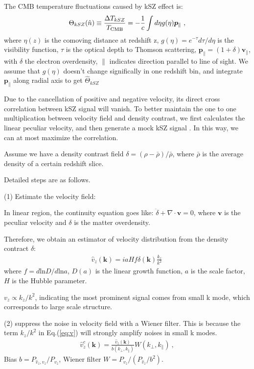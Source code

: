 \label{sec:kszRecon}
The CMB temperature fluctuations caused by kSZ effect is:
\begin{eqnarray}
\label{eq:ksz}
\Theta_{kSZ}(\hat n)\equiv\frac{\Delta T_{kSZ}}{T_{\mathrm{CMB}}}
=-\frac{1}{c}\int d\eta  g(\eta)  \bm{p}_\parallel\ ,
\end{eqnarray}
where $\eta(z)$ is the comoving distance at redshift z, $g(\eta)=e^{-\tau} d\tau/d\eta$ is the visibility function, $\tau$ is the optical depth to Thomson scattering, $\bm{p}_\parallel=(1+\delta)\bm{v}_\parallel$, with $\delta$ the electron overdensity, $\parallel$ indicates direction parallel to line of sight. 
We assume that $g(\eta)$ doesn't change significally in one redshift bin, 
and integrate $\bm{p}_\parallel$ along radial axis to get $\hat \Theta_{kSZ}$

Due to the cancellation of positive and negative velocity, its direct cross correlation between kSZ signal will vanish.
To better maintain the one to one multiplication between velocity field and density contrast, 
we first calculates the linear peculiar velocity, and then generate a mock kSZ signal 
\cite{Shao11}.
In this way, we can at most maximize the correlation.

Assume we have a density contrast field $\delta=(\rho-\bar{\rho})/\bar{\rho}$, where $\bar\rho$ is the average density of a certain redshift slice. 

Detailed steps are as follows.

(1) Estimate the velocity field:

In linear region, the continuity equation goes like:
$\dot \delta+\nabla \cdot \bm{v}=0$, 
where $\bm{v}$ is the peculiar velocity and $\delta$ is the matter overdensity. 

Therefore, we obtain an estimator of velocity distribution from the density contract $\delta$:
\begin{eqnarray}
	\label{eq:v}
\hat v_z(\bm{k})=i a H f\delta(\bm{k})\frac{k_z}{k^2}\,
\end{eqnarray}
where $f=d\mathrm{ln}D/d\mathrm{ln}a$, $D(a)$ is the linear growth function, 
$a$ is the scale factor, $H$ is the Hubble parameter.

$v_z \propto k_z/k^2$, indicating the most prominent signal comes from small k mode, which corresponds to large scale structure. 

(2) suppress the noise in velocity field with a Wiener filter. 
This is because the term $k_z/k^2$ in Eq.(\ref{eq:v}) will strongly amplify noises in small k modes. 
\begin{eqnarray}
	\label{eq:wienerv}
\hat v_z^c(\bm{k})=\frac{\hat v_z(\bm{k})}{b(k_\perp,k_\parallel)}W(k_\perp,k_\parallel)\ ,
\end{eqnarray}
Bias $b=P_{\hat v_z,v_z}/P_{v_z}$, Wiener filter $W=P_{v_z}/(P_{\hat v_z}/b^2)$.

